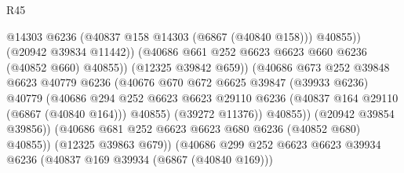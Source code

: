 \begin{lexlean}{R45}
\begin{coremodule}
{                                                @14303
                                                @6236
                                                (@40837 @158 @14303 (@6867 (@40840 @158)))
                                                @40855))
                                            (@20942 @39834 @11442))
                                          (@40686
                                            @661
                                            @252
                                            @6623
                                            @6623
                                            @660
                                            @6236
                                            (@40852 @660)
                                            @40855))
                                        (@12325 @39842 @659))
                                      (@40686
                                        @673
                                        @252
                                        @39848
                                        @6623
                                        @40779
                                        @6236
                                        (@40676
                                          @670
                                          @672
                                          @6625
                                          @39847
                                          (@39933 @6236)
                                          @40779
                                          (@40686
                                            @294
                                            @252
                                            @6623
                                            @6623
                                            @29110
                                            @6236
                                            (@40837 @164 @29110 (@6867 (@40840 @164)))
                                            @40855)
                                          (@39272 @11376))
                                        @40855))
                                    (@20942 @39854 @39856))
                                  (@40686 @681 @252 @6623 @6623 @680 @6236 (@40852 @680) @40855))
                                (@12325 @39863 @679))
                              (@40686
                                @299
                                @252
                                @6623
                                @6623
                                @39934
                                @6236
                                (@40837 @169 @39934 (@6867 (@40840 @169)))
}
\end{coremodule}
\end{lexlean}

